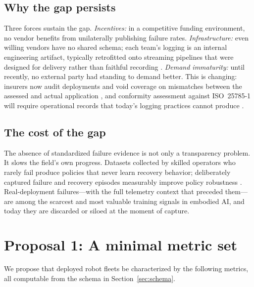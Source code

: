 \documentclass[11pt]{article}
\begin{document}
\subsection{Why the gap persists}

Three forces sustain the gap. \emph{Incentives:} in a competitive funding
environment, no vendor benefits from unilaterally publishing failure rates.
\emph{Infrastructure:} even willing vendors have no shared schema; each
team's logging is an internal engineering artifact, typically retrofitted
onto streaming pipelines that were designed for delivery rather than
faithful recording \citep{roboticstomorrow2026webrtc}. \emph{Demand
immaturity:} until recently, no external party had standing to demand
better. This is changing: insurers now audit deployments and void coverage
on mismatches between the assessed and actual application
\citep{humanoidliability2026}, and conformity assessment against
ISO~25785-1 will require operational records that today's logging practices
cannot produce \citep{iso25785}.

\subsection{The cost of the gap}

The absence of standardized failure evidence is not only a transparency
problem. It slows the field's own progress. Datasets collected by skilled
operators who rarely fail produce policies that never learn recovery
behavior; deliberately captured failure and recovery episodes measurably
improve policy robustness \citep{evsint2026teleop}. Real-deployment
failures---with the full telemetry context that preceded them---are among
the scarcest and most valuable training signals in embodied AI, and today
they are discarded or siloed at the moment of capture.

\section{Proposal 1: A minimal metric set}

We propose that deployed robot fleets be characterized by the following
metrics, all computable from the schema in Section~\ref{sec:schema}.
\end{document}
